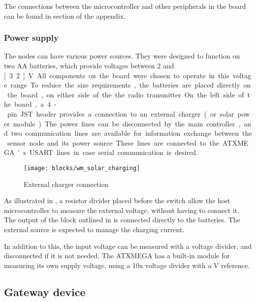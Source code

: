 The connections between the microcontroller and other peripherals in the board
can be found in section  of the appendix.

\subsubsection{Power supply}
\label{sub2:hardware-powersupply}

The nodes can have various power sources. They were designed to function on two
AA batteries, which provide voltages between 2 and \unit[3.2]{V}. All components
on the board were chosen to operate in this voltage range.

To reduce the size requirements, the batteries are placed directly on the board,
on either side of the the radio transmitter. 

On the left side of the board, a 4-pin JST header provides a connection to an
external charger (or solar power module). The power lines can be disconnected by
the main controller, and two communication lines are available for information
exchange between the sensor node and its power source. These lines are connected
to the ATXMEGA's USART lines in case serial communication is desired.

\begin{figure}[h]
  \begin{center}
    \texttt{[image: blocks/wm\_solar\_charging]}
  \end{center}
  \caption{External charger connection}
  \label{fig:solar-charger}
\end{figure}

As illustrated in , a resistor divider placed before the
switch allow the host microcontroller to measure the external voltage, without
having to connect it. The output of the block outlined in
 is connected directly to the batteries. The external
source is expected to manage the charging current.

In addition to this, the input voltage can be measured with a voltage divider,
and disconnected if it is not needed. The ATXMEGA has a built-in module for
measuring its own supply voltage, using a 10x voltage divider with a \unit[1]{V}
reference.

\subsection{Gateway device}

